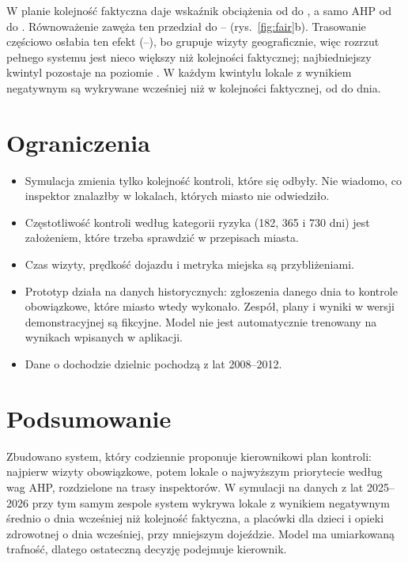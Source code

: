 \documentclass[11pt,a4paper]{article}
\begin{document}
W planie kolejność faktyczna daje wskaźnik obciążenia od \BurdenCityMin{} do \BurdenCityMax,
a samo AHP od \BurdenAhpMin{} do \BurdenAhpMax. Równoważenie zawęża ten przedział do
\BurdenFairMin--\BurdenFairMax{} (rys.~\ref{fig:fair}b). Trasowanie częściowo osłabia ten efekt
(\BurdenSysMin--\BurdenSysMax), bo grupuje wizyty geograficznie, więc rozrzut pełnego systemu
jest nieco większy niż kolejności faktycznej; najbiedniejszy kwintyl pozostaje na poziomie
\BurdenSysPoorest. W każdym kwintylu lokale z wynikiem negatywnym są wykrywane wcześniej niż
w kolejności faktycznej, od \QDaysSysMin{} do \QDaysSysMax{} dnia.

\section{Ograniczenia}

\begin{itemize}
  \item Symulacja zmienia tylko kolejność kontroli, które się odbyły. Nie wiadomo, co inspektor
        znalazłby w lokalach, których miasto nie odwiedziło.
  \item Częstotliwość kontroli według kategorii ryzyka (182, 365 i 730 dni) jest założeniem,
        które trzeba sprawdzić w przepisach miasta.
  \item Czas wizyty, prędkość dojazdu i metryka miejska są przybliżeniami.
  \item Prototyp działa na danych historycznych: zgłoszenia danego dnia to kontrole obowiązkowe,
        które miasto wtedy wykonało. Zespół, plany i wyniki w wersji demonstracyjnej są fikcyjne.
        Model nie jest automatycznie trenowany na wynikach wpisanych w aplikacji.
  \item Dane o dochodzie dzielnic pochodzą z lat 2008--2012.
\end{itemize}

\section{Podsumowanie}

Zbudowano system, który codziennie proponuje kierownikowi plan kontroli: najpierw wizyty
obowiązkowe, potem lokale o najwyższym priorytecie według wag AHP, rozdzielone na trasy
inspektorów. W symulacji na danych
z lat 2025--2026 przy tym samym zespole system wykrywa lokale z wynikiem negatywnym średnio
o \DaysSys{} dnia wcześniej niż kolejność faktyczna, a placówki dla dzieci i opieki zdrowotnej
o \DaysHiSys{} dnia wcześniej, przy mniejszym dojeździe. Model ma umiarkowaną trafność, dlatego
ostateczną decyzję podejmuje kierownik.
\end{document}
